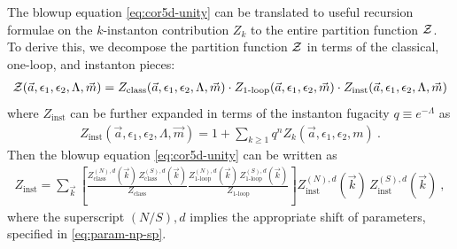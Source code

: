\documentclass[letterpaper, 11pt]{article}
\def\CZ{{\cal Z}}
\def\e{\epsilon}
\begin{document}
The blowup equation  \eqref{eq:cor5d-unity} can be translated to useful recursion formulae on the $k$-instanton contribution $Z_k$ to the entire partition function $\CZ$.
To derive this, we decompose the partition function $\CZ$ in terms of the classical, one-loop, and instanton pieces: 
\begin{align}
  \CZ(\vec{a}, \e_1, \e_2, \Lambda, \vec{m}) = Z_{\textrm{class}}(\vec{a}, \e_1, \e_2, \Lambda, \vec{m}) \cdot  Z_{\textrm{1-loop}} (\vec{a}, \e_1, \e_2, \vec{m}) \cdot Z_{\textrm{inst}}(\vec{a}, \e_1, \e_2, \Lambda, \vec{m})
 \end{align}
 where $Z_\text{inst}$ can be further expanded in terms of the instanton fugacity $q \equiv e^{-\Lambda}$ as
\begin{align}
 Z_{\textrm{inst}} (\vec{a}, \e_1, \e_2, \Lambda, \vec{m}) = 1 + \sum_{k \ge 1} q^n Z_k (\vec{a}, \e_1, \e_2, m) \ . 
\end{align}
Then the blowup equation \eqref{eq:cor5d-unity} can be written as
\begin{align}
  \label{eq:recur-inst}
 Z_{\textrm{inst}} = \sum_{\vec{k}} \left[ \frac{Z^{(N), d}_{\textrm{class}}(\vec{k}) \, Z^{(S), d}_{\textrm{class}}(\vec{k})}{Z_{\textrm{class}}}  \frac{Z^{(N), d}_{\textrm{1-loop}}(\vec{k})\, Z^{(S), d}_{\textrm{1-loop}}(\vec{k})}{Z_{\textrm{1-loop}}} \right] Z^{(N), d}_{\textrm{inst}}(\vec{k})\, Z^{(S), d}_{\textrm{inst}}(\vec{k})  \ , 
\end{align}
where the superscript $(N/S),d$ implies the appropriate shift of parameters, specified in \eqref{eq:param-np-sp}. 
\end{document}
